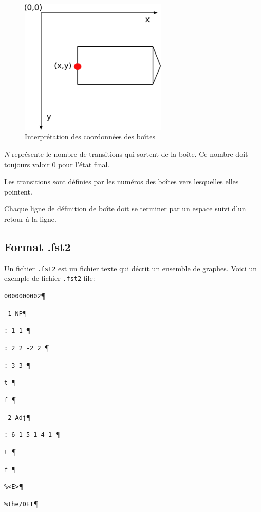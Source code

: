 \begin{figure}[!h]
\begin{center}
\includegraphics[width=7cm]{resources/img/repere.png}
\caption{Interprétation des coordonnées des boîtes\label{fig-box-coordinates}}
\end{center}
\end{figure}

\bigskip
\noindent \textit{N} représente le nombre de transitions qui sortent de la boîte. Ce nombre doit
toujours valoir $0$ pour l’état final.

\bigskip
\noindent Les transitions sont définies par les numéros des boîtes vers lesquelles elles pointent.

\bigskip
\noindent Chaque ligne de définition de boîte doit se terminer par un espace suivi d’un retour à la
ligne.

\subsection{Format .fst2}
Un fichier \verb+.fst2+ est un fichier texte qui décrit un ensemble de graphes. Voici un exemple
de fichier \verb+.fst2+ file:

\bigskip
\verb+0000000002+\P

\verb+-1 NP+\P

\verb+: 1 1 +\P

\verb+: 2 2 -2 2 +\P

\verb+: 3 3 +\P

\verb+t +\P

\verb+f +\P

\verb+-2 Adj+\P

\verb+: 6 1 5 1 4 1 +\P

\verb+t +\P

\verb+f +\P

\verb+%<E>+\P

\verb+%the/DET+\P

